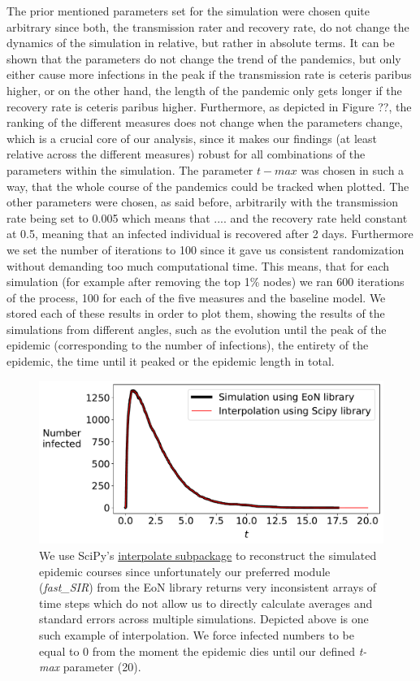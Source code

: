 \documentclass{Resources/netsci-project}
\begin{document}
The prior mentioned parameters set for the simulation were chosen quite arbitrary since both, the transmission rater and recovery rate, do not change the dynamics of the simulation in relative, but rather in absolute terms. It can be shown that the parameters do not change the trend of the pandemics, but only either cause more infections in the peak if the transmission rate is ceteris paribus higher, or on the other hand, the length of the pandemic only gets longer if the recovery rate is ceteris paribus higher. Furthermore, as depicted in Figure ??, the ranking of the different measures does not change when the parameters change, which is a crucial core of our analysis, since it makes our findings (at least relative across the different measures) robust for all combinations of the parameters within the simulation. The parameter $t-max$ was chosen in such a way, that the whole course of the pandemics could be tracked when plotted. The other parameters were chosen, as said before, arbitrarily with the transmission rate being set to 0.005 which means that .... and the recovery rate held constant at 0.5, meaning that an infected individual is recovered after 2 days. Furthermore we set the number of iterations to 100 since it gave us consistent randomization without demanding too much computational time. This means, that for each simulation (for example after removing the top 1\% nodes) we ran 600 iterations of the process, 100 for each of the five measures and the baseline model. We stored each of these results in order to plot them, showing the results of the simulations from different angles, such as the evolution until the peak of the epidemic (corresponding to the number of infections), the entirety of the epidemic, the time until it peaked or the epidemic length in total. 





\begin{figure}[!ht]
    \centering
    \includegraphics[width=0.5\linewidth]{Figures/interpolation_test.pdf}
    \caption{We use SciPy's \href{https://docs.scipy.org/doc/scipy/reference/interpolate.html}{interpolate subpackage} to reconstruct the simulated epidemic courses since unfortunately our preferred module (\textit{fast\_SIR}) from the EoN library returns very inconsistent arrays of time steps which do not allow us to directly calculate averages and standard errors across multiple simulations. Depicted above is one such example of interpolation. We force infected numbers to be equal to 0 from the moment the epidemic dies until our defined \textit{t-max} parameter (20).}
    \label{fig:interpolation_test}
\end{figure}
\end{document}
